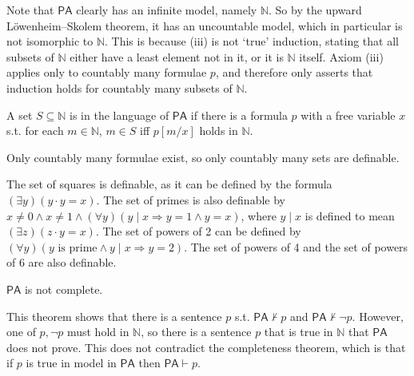Note that $\mathsf{PA}$ clearly has an infinite model, namely $\mathbb N$.
So by the upward L\"owenheim--Skolem theorem, it has an uncountable model, which in particular is not isomorphic to $\mathbb N$.
This is because (iii) is not `true' induction, stating that all subsets of $\mathbb N$ either have a least element not in it, or it is $\mathbb N$ itself.
Axiom (iii) applies only to countably many formulae $p$, and therefore only asserts that induction holds for countably many subsets of $\mathbb N$.
\begin{definition}
    A set $S \subseteq \mathbb N$ is  in the language of $\mathsf{PA}$ if there is a formula $p$ with a free variable $x$ s.t. for each $m \in \mathbb N$, $m \in S$ iff $p[m/x]$ holds in $\mathbb N$.
\end{definition}
Only countably many formulae exist, so only countably many sets are definable.
\begin{example}
    The set of squares is definable, as it can be defined by the formula $(\exists y)(y\cdot y = x)$.
    The set of primes is also definable by $x \neq 0 \wedge x \neq 1 \wedge (\forall y)(y \mid x \Rightarrow y = 1 \wedge y = x)$, where $y \mid x$ is defined to mean $(\exists z)(z \cdot y = x)$.
    The set of powers of 2 can be defined by $(\forall y)(y \text{ is prime} \wedge y \mid x \Rightarrow y = 2)$.
    The set of powers of 4 and the set of powers of 6 are also definable.
\end{example}
\begin{theorem}
    $\mathsf{PA}$ is not complete.
\end{theorem}
This theorem shows that there is a sentence $p$ s.t. $\mathsf{PA} \not\vdash p$ and $\mathsf{PA} \not\vdash \neg p$.
However, one of $p, \neg p$ must hold in $\mathbb N$, so there is a sentence $p$ that is true in $\mathbb N$ that $\mathsf{PA}$ does not prove.
This does not contradict the completeness theorem, which is that if $p$ is true in  model in $\mathsf{PA}$ then $\mathsf{PA} \vdash p$.
